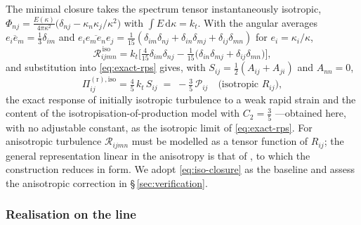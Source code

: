 \documentclass[11pt,a4paper]{article}
\begin{document}
The minimal closure takes the spectrum tensor instantaneously isotropic,
$\Phi_{nj}=\frac{E(\kappa)}{4\pi\kappa^2}
\big(\delta_{nj}-\kappa_n\kappa_j/\kappa^2\big)$ with
$\int E\,\mathrm{d}\kappa=k_t$. With the angular averages
$\overline{e_ie_m}=\tfrac13\delta_{im}$ and
$\overline{e_ie_me_ne_j}=\tfrac1{15}(\delta_{im}\delta_{nj}
+\delta_{in}\delta_{mj}+\delta_{ij}\delta_{mn})$ for
$e_i=\kappa_i/\kappa$,
\begin{equation}
  \mathcal{R}_{ijmn}^{\,\mathrm{iso}}
  = k_t\Big[\tfrac{4}{15}\delta_{im}\delta_{nj}
    -\tfrac1{15}\big(\delta_{in}\delta_{mj}
    +\delta_{ij}\delta_{mn}\big)\Big],
  \label{eq:iso-closure}
\end{equation}
and substitution into \eqref{eq:exact-rps} gives, with
$S_{ij}=\tfrac12(A_{ij}+A_{ji})$ and $A_{nn}=0$,
\begin{equation}
  \Pi^{(\mathrm r),\mathrm{iso}}_{ij}
  = \tfrac{4}{5}\,k_t\,S_{ij}
  \;=\; -\tfrac{3}{5}\,\mathcal{P}_{ij}
  \quad\text{(isotropic $R_{ij}$)},
  \label{eq:crow}
\end{equation}
the exact response of initially isotropic turbulence to a weak rapid
strain \citep{Crow1968} and the content of the
isotropisation-of-production model with $C_2=\tfrac35$
\citep{Pope2000}---obtained here, with no adjustable constant, as the
isotropic limit of \eqref{eq:exact-rps}. For anisotropic turbulence
$\mathcal{R}_{ijmn}$ must be modelled as a tensor function of $R_{ij}$;
the general representation linear in the anisotropy is that of
\citet{LaunderReeceRodi1975}, to which the construction reduces in form.
We adopt \eqref{eq:iso-closure} as the baseline and assess the
anisotropic correction in \S\,\ref{sec:verification}.

\subsubsection{Realisation on the line}\label{sec:line-realisation}
\end{document}
